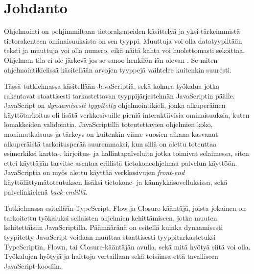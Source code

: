 \chapter{Johdanto} \label{Johdanto}

Ohjelmointi on pohjimmiltaan tietorakenteiden käsittelyä ja yksi tärkeimmistä
tietorakenteen ominaisuuksista on sen tyyppi. Muuttuja  voi olla
datatyypiltään teksti ja muuttuja  voi olla numero, eikä näitä kahta voi
huolettomasti sekoittaa. Ohjelman tila ei ole järkevä jos se sanoo henkilön
iän olevan . Se miten ohjelmointikielissä käsitellään arvojen tyyppejä
vaihtelee kuitenkin suuresti.

Tässä tutkielmassa käsitellään JavaScriptiä, sekä kolmea työkalua jotka
rakentavat staattisesti tarkastettavan tyyppijärjestelmän
JavaScriptin päälle. JavaScript on \textit{dynaamisesti tyypitetty} ohjelmointikieli,
jonka alkuperäinen käyttötarkoitus oli lisätä verkkosivuille pieniä
interaktiivisia ominaisuuksia, kuten lomakkeiden validointia. JavaScriptillä
toteutettavien ohjelmien koko, monimutkaisuus ja tärkeys on kuitenkin viime
vuosien aikana kasvanut alkuperäistä tarkoitusperää suuremmaksi, kun sillä on
alettu toteuttaa esimerkiksi kartta-, kirjoitus- ja hallintapalveluita jotka
toimivat selaimessa, siten ettei käyttäjän tarvitse asentaa erillistä
tietokoneohjelmaa palvelun käyttöön. JavaScriptia on myös alettu käyttää
verkkosivujen \textit{front-end} käyt\-tö\-liit\-ty\-mä\-to\-teu\-tuk\-sen
lisäksi tietokone- ja kän\-nyk\-kä\-so\-vel\-luk\-sis\-sa, sekä
pal\-ve\-lin\-kie\-le\-nä \textit{back-endillä}.

Tutkielmassa esitellään TypeScript, Flow ja Closure-kääntäjä, joista jokainen on
tarkoitettu työkaluksi sellaisten ohjelmien kehittämiseen, jotka muuten kehitettäisiin
JavaScriptilla. Päämääränä on esitellä kuinka dynaamisesti tyypitetty JavaScript voidaan
muuttaa staattisesti tyyppitarkastetuksi TypeScriptin, Flown, tai Closure-kääntäjän
avulla, sekä mitä hyötyä siitä voi olla. Työkalujen hyötyjä ja haittoja
vertaillaan sekä toisiinsa että tavalliseen JavaScript-koodiin.
